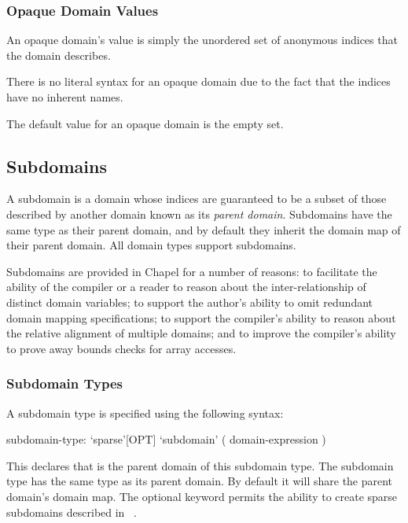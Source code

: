 \subsubsection{Opaque Domain Values}
\label{Opaque_Domain_Values}

An opaque domain's value is simply the unordered set of anonymous
indices that the domain describes.


There is no literal syntax for an opaque domain due to the fact that
the indices have no inherent names.


The default value for an opaque domain is the empty set.


\subsection{Subdomains}
\label{Subdomains}

A subdomain is a domain whose indices are guaranteed to be a subset of
those described by another domain known as its \emph{parent domain}.
Subdomains have the same type as their parent domain, and by default
they inherit the domain map of their parent domain.  All domain types
support subdomains.

\begin{rationale}
Subdomains are provided in Chapel for a number of reasons: to
facilitate the ability of the compiler or a reader to reason about the
inter-relationship of distinct domain variables; to support the
author's ability to omit redundant domain mapping specifications; to
support the compiler's ability to reason about the relative alignment
of multiple domains; and to improve the compiler's ability to prove
away bounds checks for array accesses.
\end{rationale}

\subsubsection{Subdomain Types}
\label{Subdomain_Types}

A subdomain type is specified using the following syntax:
\begin{syntax}
subdomain-type:
  `sparse'[OPT] `subdomain' ( domain-expression )
\end{syntax}
This declares that  is the parent domain of
this subdomain type.  The subdomain type has the same type as its
parent domain.  By default it will share the parent domain's domain
map.  The optional  keyword permits the ability to
create sparse subdomains described in ~.

